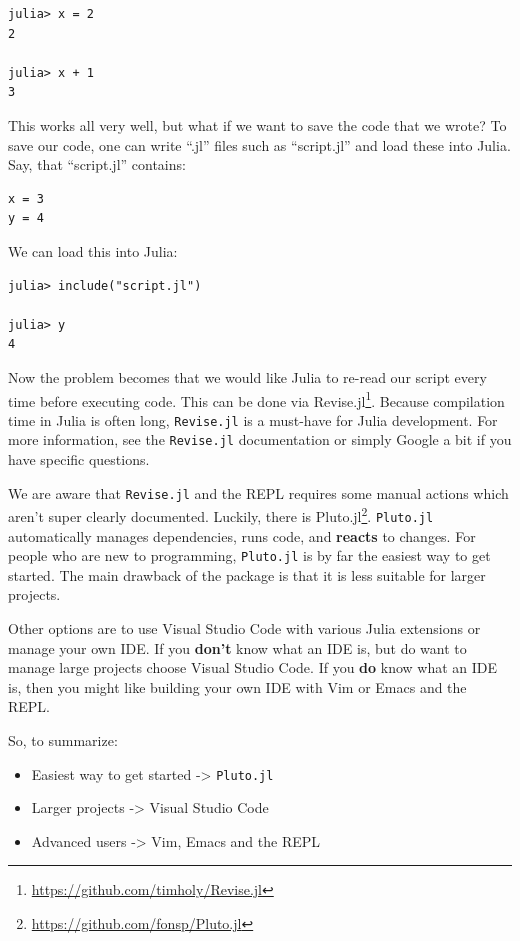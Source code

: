 \documentclass[
  notoc %
]{tufte-book}
\DeclareRobustCommand{\href}[2]{#2\footnote{\url{#1}}}
\providecommand{\tightlist}{%
  \setlength{\itemsep}{0pt}\setlength{\parskip}{0pt}
}
\newcommand{\passthrough}[1]{#1}
\begin{document}
\begin{lstlisting}
julia> x = 2
2

julia> x + 1
3
\end{lstlisting}

This works all very well, but what if we want to save the code that we
wrote? To save our code, one can write ``.jl'' files such as
``script.jl'' and load these into Julia. Say, that ``script.jl''
contains:

\begin{lstlisting}
x = 3
y = 4
\end{lstlisting}

We can load this into Julia:

\begin{lstlisting}
julia> include("script.jl")

julia> y
4
\end{lstlisting}

Now the problem becomes that we would like Julia to re-read our script
every time before executing code. This can be done via
\href{https://github.com/timholy/Revise.jl}{Revise.jl}. Because
compilation time in Julia is often long,
\passthrough{\lstinline!Revise.jl!} is a must-have for Julia
development. For more information, see the
\passthrough{\lstinline!Revise.jl!} documentation or simply Google a bit
if you have specific questions.

We are aware that \passthrough{\lstinline!Revise.jl!} and the REPL
requires some manual actions which aren't super clearly documented.
Luckily, there is \href{https://github.com/fonsp/Pluto.jl}{Pluto.jl}.
\passthrough{\lstinline!Pluto.jl!} automatically manages dependencies,
runs code, and \textbf{reacts} to changes. For people who are new to
programming, \passthrough{\lstinline!Pluto.jl!} is by far the easiest
way to get started. The main drawback of the package is that it is less
suitable for larger projects.

Other options are to use Visual Studio Code with various Julia
extensions or manage your own IDE. If you \textbf{don't} know what an
IDE is, but do want to manage large projects choose Visual Studio Code.
If you \textbf{do} know what an IDE is, then you might like building
your own IDE with Vim or Emacs and the REPL.

So, to summarize:

\begin{itemize}
\tightlist
\item
  Easiest way to get started -\textgreater{}
  \passthrough{\lstinline!Pluto.jl!}
\item
  Larger projects -\textgreater{} Visual Studio Code
\item
  Advanced users -\textgreater{} Vim, Emacs and the REPL
\end{itemize}
\end{document}
